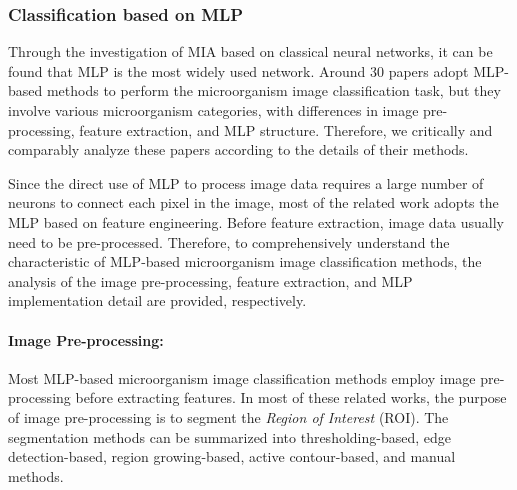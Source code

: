 \subsubsection{Classification based on MLP}
\label{CMLP}
Through the investigation of MIA based on classical neural networks, it can be found that MLP is the most widely used network. Around 30 papers adopt MLP-based methods to perform the microorganism image classification task, but they involve various microorganism categories, with differences in image pre-processing, feature extraction, and MLP structure. Therefore, we critically and comparably analyze these papers according to the details of their methods.

Since the direct use of MLP to process image data requires a large number of neurons to connect each pixel in the image, most of the related work adopts the MLP based on feature engineering. Before feature extraction, image data usually need to be pre-processed. Therefore, to comprehensively understand the characteristic of MLP-based microorganism image classification methods, the analysis of the image pre-processing, feature extraction, and MLP implementation detail are provided, respectively.

\paragraph{\textbf{Image Pre-processing:}}
Most MLP-based microorganism image classification methods employ image pre-processing before extracting features. In most of these related works, the purpose of image pre-processing is to segment the \emph{Region of Interest} (ROI). The segmentation methods can be summarized into thresholding-based, edge detection-based, region growing-based, active contour-based, and manual methods.

